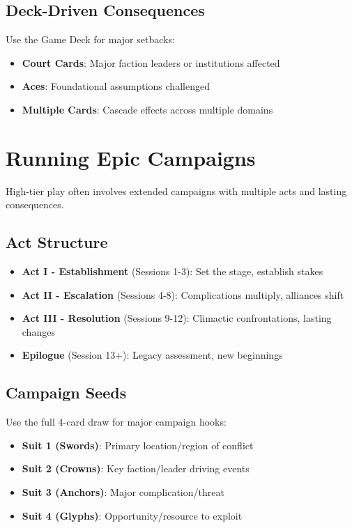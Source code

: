 \subsection*{Deck-Driven Consequences}

Use the Game Deck for major setbacks:
\begin{itemize}
    \item \textbf{Court Cards}: Major faction leaders or institutions affected
    \item \textbf{Aces}: Foundational assumptions challenged
    \item \textbf{Multiple Cards}: Cascade effects across multiple domains
\end{itemize}

\section{Running Epic Campaigns}

High-tier play often involves extended campaigns with multiple acts and lasting consequences.

\subsection*{Act Structure}

\begin{itemize}
    \item \textbf{Act I - Establishment} (Sessions 1-3): Set the stage, establish stakes
    \item \textbf{Act II - Escalation} (Sessions 4-8): Complications multiply, alliances shift
    \item \textbf{Act III - Resolution} (Sessions 9-12): Climactic confrontations, lasting changes
    \item \textbf{Epilogue} (Session 13+): Legacy assessment, new beginnings
\end{itemize}

\subsection*{Campaign Seeds}

Use the full 4-card draw for major campaign hooks:
\begin{itemize}
    \item \textbf{Suit 1 (Swords)}: Primary location/region of conflict
    \item \textbf{Suit 2 (Crowns)}: Key faction/leader driving events
    \item \textbf{Suit 3 (Anchors)}: Major complication/threat
    \item \textbf{Suit 4 (Glyphs)}: Opportunity/resource to exploit
\end{itemize}

